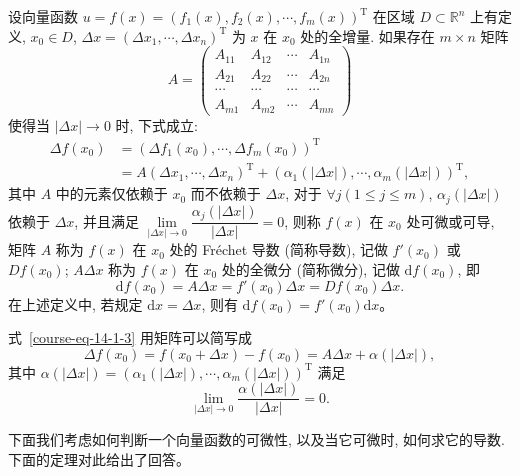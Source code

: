 \documentclass[UTF8,12pt,a4paper,fontset=fandol]{ctexart}
\begin{document}
\begin{definition}\label{course-definition-14-1-5}\quad 设向量函数 $u=f(x)=(f_1(x),f_2(x),\cdots,f_m(x))^\mathrm T$ 在区域 $D\subset\mathbb R^n$ 上有定义, $x_0\in D$, $\Delta x=(\Delta x_1,\cdots,\Delta x_n)^\mathrm T$ 为 $x$ 在 $x_0$ 处的全增量. 如果存在 $m\times n$ 矩阵
\[
  A=
  \begin{pmatrix}
    A_{11}&A_{12}&\cdots&A_{1n}\\
    A_{21}&A_{22}&\cdots&A_{2n}\\
    \cdots&\cdots&\cdots&\cdots\\
    A_{m1}&A_{m2}&\cdots&A_{mn}
  \end{pmatrix}
\]
使得当 $|\Delta x|\to0$ 时, 下式成立:
\begin{equation}
\begin{aligned}
  \Delta f(x_0)
  &=(\Delta f_1(x_0),\cdots,\Delta f_m(x_0))^\mathrm T\\
  &=A(\Delta x_1,\cdots,\Delta x_n)^\mathrm T
  +(\alpha_1(|\Delta x|),\cdots,\alpha_m(|\Delta x|))^\mathrm T,
\end{aligned}
\label{course-eq-14-1-3}
\end{equation}
其中 $A$ 中的元素仅依赖于 $x_0$ 而不依赖于 $\Delta x$, 对于 $\forall j(1\leqslant j\leqslant m)$, $\alpha_j(|\Delta x|)$ 依赖于 $\Delta x$, 并且满足 $\lim\limits_{|\Delta x|\to0}\dfrac{\alpha_j(|\Delta x|)}{|\Delta x|}=0$, 则称 $f(x)$ 在 $x_0$ 处可微或可导, 矩阵 $A$ 称为 $f(x)$ 在 $x_0$ 处的 Fréchet 导数 (简称导数), 记做 $f'(x_0)$ 或 $Df(x_0)$; $A\Delta x$ 称为 $f(x)$ 在 $x_0$ 处的全微分 (简称微分), 记做 $\mathrm df(x_0)$, 即
\[
  \mathrm df(x_0)=A\Delta x=f'(x_0)\Delta x=Df(x_0)\Delta x.
\]
在上述定义中, 若规定 $\mathrm dx=\Delta x$, 则有 $\mathrm df(x_0)=f'(x_0)\mathrm dx$。

式~\eqref{course-eq-14-1-3}  用矩阵可以简写成
\[
  \Delta f(x_0)=f(x_0+\Delta x)-f(x_0)=A\Delta x+\alpha(|\Delta x|),
\]
其中 $\alpha(|\Delta x|)=(\alpha_1(|\Delta x|),\cdots,\alpha_m(|\Delta x|))^\mathrm T$ 满足
\[
  \lim_{|\Delta x|\to0}\frac{\alpha(|\Delta x|)}{|\Delta x|}=0.
\]

下面我们考虑如何判断一个向量函数的可微性, 以及当它可微时, 如何求它的导数. 下面的定理对此给出了回答。

\end{definition}
\end{document}
